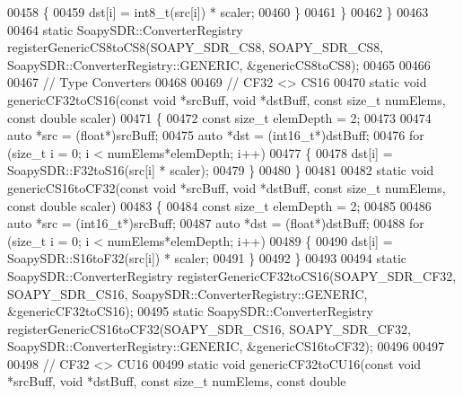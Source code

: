 \begin{DoxyCode}
00458     \{
00459       dst[i] = int8\_t(src[i]) * scaler;
00460     \}
00461     \}
00462 \}
00463 
00464 \textcolor{keyword}{static} SoapySDR::ConverterRegistry registerGenericCS8toCS8(SOAPY_SDR_CS8, 
      SOAPY_SDR_CS8, SoapySDR::ConverterRegistry::GENERIC, &genericCS8toCS8);
00465 
00466 
00467 \textcolor{comment}{// Type Converters}
00468 
00469 \textcolor{comment}{// CF32 <> CS16}
00470 \textcolor{keyword}{static} \textcolor{keywordtype}{void} genericCF32toCS16(\textcolor{keyword}{const} \textcolor{keywordtype}{void} *srcBuff, \textcolor{keywordtype}{void} *dstBuff, \textcolor{keyword}{const} \textcolor{keywordtype}{size\_t} numElems, \textcolor{keyword}{const} \textcolor{keywordtype}{double} 
      scaler)
00471 \{
00472   \textcolor{keyword}{const} \textcolor{keywordtype}{size\_t} elemDepth = 2;
00473 
00474   \textcolor{keyword}{auto} *src = (\textcolor{keywordtype}{float}*)srcBuff;
00475   \textcolor{keyword}{auto} *dst = (int16\_t*)dstBuff;
00476   \textcolor{keywordflow}{for} (\textcolor{keywordtype}{size\_t} i = 0; i < numElems*elemDepth; i++)
00477     \{
00478       dst[i] = SoapySDR::F32toS16(src[i] * scaler);
00479     \}
00480 \}
00481 
00482 \textcolor{keyword}{static} \textcolor{keywordtype}{void} genericCS16toCF32(\textcolor{keyword}{const} \textcolor{keywordtype}{void} *srcBuff, \textcolor{keywordtype}{void} *dstBuff, \textcolor{keyword}{const} \textcolor{keywordtype}{size\_t} numElems, \textcolor{keyword}{const} \textcolor{keywordtype}{double} 
      scaler)
00483 \{
00484   \textcolor{keyword}{const} \textcolor{keywordtype}{size\_t} elemDepth = 2;
00485 
00486   \textcolor{keyword}{auto} *src = (int16\_t*)srcBuff;
00487   \textcolor{keyword}{auto} *dst = (\textcolor{keywordtype}{float}*)dstBuff;
00488   \textcolor{keywordflow}{for} (\textcolor{keywordtype}{size\_t} i = 0; i < numElems*elemDepth; i++)
00489     \{
00490       dst[i] = SoapySDR::S16toF32(src[i]) * scaler;
00491     \}
00492 \}
00493 
00494 \textcolor{keyword}{static} SoapySDR::ConverterRegistry registerGenericCF32toCS16(SOAPY_SDR_CF32, 
      SOAPY_SDR_CS16, SoapySDR::ConverterRegistry::GENERIC, &genericCF32toCS16);
00495 \textcolor{keyword}{static} SoapySDR::ConverterRegistry registerGenericCS16toCF32(SOAPY_SDR_CS16, 
      SOAPY_SDR_CF32, SoapySDR::ConverterRegistry::GENERIC, &genericCS16toCF32);
00496 
00497 
00498 \textcolor{comment}{// CF32 <> CU16}
00499 \textcolor{keyword}{static} \textcolor{keywordtype}{void} genericCF32toCU16(\textcolor{keyword}{const} \textcolor{keywordtype}{void} *srcBuff, \textcolor{keywordtype}{void} *dstBuff, \textcolor{keyword}{const} \textcolor{keywordtype}{size\_t} numElems, \textcolor{keyword}{const} \textcolor{keywordtype}{double} 

\end{DoxyCode}
